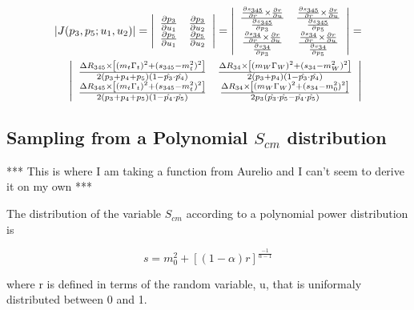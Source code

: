 \begin{eqnarray}
\nonumber
|J(p_{3}, p_{5} ; u_{1}, u_{2})| = \left| \begin{array}{cc}
\frac{\partial p_{3}}{\partial u_{1}}	& \frac{\partial p_{3}}{\partial u_{2}} \\
\frac{\partial p_{5}}{\partial u_{1}}	& \frac{\partial p_{5}}{\partial u_{2}} \\
\end{array} \right| = 
\nonumber
\left| \begin{array}{cc}
\frac{\frac{\partial s_{345}}{\partial r} \times \frac{\partial r}{\partial u}}{\frac{\partial s_{345}}{\partial p_{3}}}	& \frac{\frac{\partial s_{345}}{\partial r} \times
\frac{\partial r}{\partial u}}{\frac{\partial s_{345}}{\partial p_{5}}} \\
\frac{\frac{\partial s_{34}}{\partial r} \times \frac{\partial r}{\partial u}}{\frac{\partial s_{34}}{\partial p_{3}}}	& \frac{\frac{\partial s_{34}}{\partial r} \times
\frac{\partial r}{\partial u}}{\frac{\partial s_{34}}{\partial p_{5}}}
\end{array} \right| = \\
\left| \begin{array}{cc}
\frac{\Delta R_{345} \times \left[
(m_{t}\Gamma_{t})^{2} + (s_{345} - m_{t}^{2})^{2} \right]}{2(p_{3} + p_{4} + p_{5})(1 - \hat{p_{3}} \cdot \hat{p_{4}})}	& \frac{\Delta R_{34} \times \left[
(m_{W}\Gamma_{W})^{2} + (s_{34} - m_{W}^{2})^{2} \right]}{2(p_{3} + p_{4})(1 -
\hat{p_{3}} \cdot \hat{p_{4}})} \\
\frac{\Delta R_{345} \times \left[
(m_{t}\Gamma_{t})^{2} + (s_{345} - m_{t}^{2})^{2} \right]}{2(p_{3} + p_{4} + p_{5})(1 - \hat{p_{4}} \cdot \hat{p_{5}})}	& \frac{\Delta R_{34} \times \left[
(m_{W}\Gamma_{W})^{2} + (s_{34} - m_{0}^{2})^{2} \right]}{2p_{3}(\hat{p_{3}} \cdot \hat{p_{5}} - \hat{p_{4}} \cdot \hat{p_{5}})}
\end{array}
\right|
\end{eqnarray}


\subsection{Sampling from a Polynomial $S_{cm}$ distribution}

*** This is where I am taking a function from Aurelio and I can't seem to derive
it on my own ***

The distribution of the variable $S_{cm}$ according to a polynomial power
distribution is

\begin{equation}
\label{defines_power}
s = m_{0}^{2} + \left[ (1-\alpha)r \right]^{\frac{-1}{\alpha - 1}}
\end{equation}

where r is defined in terms of the random variable, u, that is uniformaly
distributed between 0 and 1.

